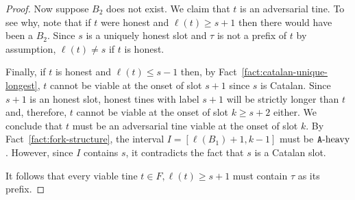 \begin{proof}
    Now suppose $B_2$ does not exist.  We claim that $t$ is an
    adversarial tine.  To see why, note that if $t$ were honest and
    $\ell(t) \geq s + 1$ then there would have been a $B_2$.  Since
    $s$ is a uniquely honest slot and $\tau$ is not a prefix of $t$ by
    assumption, $\ell(t) \neq s$ if $t$ is honest.

    
    Finally, if $t$ is honest and $\ell(t) \leq s - 1$ then, 
    by Fact~\ref{fact:catalan-unique-longest}, 
    $t$ cannot be viable at the onset of slot $s + 1$ 
    since $s$ is Catalan. 
    Since $s + 1$ is an honest slot, 
    honest tines with label $s + 1$ will be strictly longer than $t$ 
    and, therefore, 
    $t$ cannot be viable at the onset of slot $k \geq s + 2$ either. 
    We conclude that $t$ must be an adversarial tine viable at the onset of slot $k$. 
    By Fact~\ref{fact:fork-structure},       
    the interval $I = [\ell(B_1) + 1, k - 1]$ must be $\mathtt{A}\text{-heavy}$. 
    However, since $I$ contains $s$, it contradicts the fact that $s$ is a Catalan slot. 

    It follows that every viable tine 
    $t \in F, \ell(t) \geq s + 1$ must contain $\tau$ as its prefix. 
  \end{proof}



